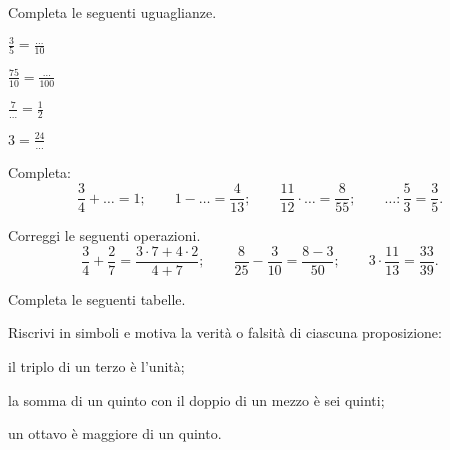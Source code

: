 \begin{esercizio}
Completa le seguenti uguaglianze.
\begin{multicols}{4}
\begin{enumeratea}
\item \(\displaystyle{\frac{3}{5}=\frac{\ldots}{10}}\)
\item \(\displaystyle{\frac{75}{10}=\frac{\ldots}{100}}\)
\item \(\displaystyle{\frac{7}{\ldots}=\frac{1}{2}}\)
\item \(\displaystyle{3=\frac{24}{\ldots}}\)
\end{enumeratea}
\end{multicols}
\end{esercizio}

\begin{esercizio}
Completa:
\[\frac{3}{4}+\ldots=1;\qquad1-\ldots=\frac{4}{13};\qquad\frac{11}{12}\cdot
\ldots=\frac{8}{55};%
\qquad\ldots:\frac{5}{3}=\frac{3}{5}.\]
\end{esercizio}

\begin{esercizio}
Correggi le seguenti operazioni.
\[\frac{3}{4}+\frac{2}{7}=\frac{3\cdot7+4\cdot2}{4+7};\qquad%
\frac{8}{25}-\frac{3}{10}=\frac{8-3}{50};\qquad%
3\cdot\frac{11}{13}=\frac{33}{39}.\]
\end{esercizio}

\begin{esercizio}
Completa le seguenti tabelle.

\begin{minipage}{.45\textwidth}
 \begin{center}
 
\end{center}
\end{minipage}
\begin{minipage}{.45\textwidth}
 \begin{center}
 
\end{center}
\end{minipage}
\end{esercizio}

\begin{esercizio}
Riscrivi in simboli e motiva la verità o falsità di ciascuna proposizione:
\begin{enumeratea}
\item il triplo di un terzo è l'unità;
\item la somma di un quinto con il doppio di un mezzo è sei quinti;
\item un ottavo è maggiore di un quinto.
\end{enumeratea}
\end{esercizio}

